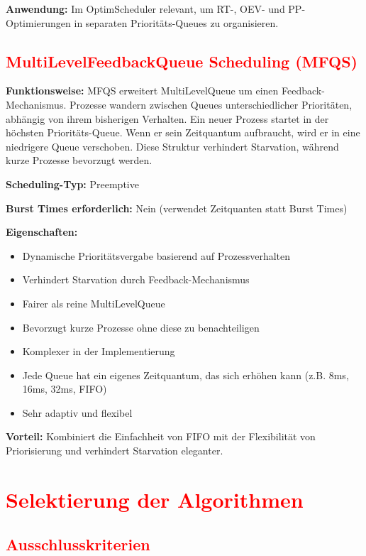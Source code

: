 \textbf{Anwendung:} Im OptimScheduler relevant, um RT-, OEV- und PP-Optimierungen in separaten Prioritäts-Queues zu organisieren.

\subsection{\textcolor{red}{MultiLevelFeedbackQueue Scheduling (MFQS)}}

\textbf{Funktionsweise:} MFQS erweitert MultiLevelQueue um einen Feedback-Mechanismus. Prozesse wandern zwischen Queues unterschiedlicher Prioritäten, abhängig von ihrem bisherigen Verhalten. Ein neuer Prozess startet in der höchsten Prioritäts-Queue. Wenn er sein Zeitquantum aufbraucht, wird er in eine niedrigere Queue verschoben. Diese Struktur verhindert Starvation, während kurze Prozesse bevorzugt werden.

\textbf{Scheduling-Typ:} Preemptive

\textbf{Burst Times erforderlich:} Nein (verwendet Zeitquanten statt Burst Times)

\textbf{Eigenschaften:}
\begin{itemize}
    \item Dynamische Prioritätsvergabe basierend auf Prozessverhalten
    \item Verhindert Starvation durch Feedback-Mechanismus
    \item Fairer als reine MultiLevelQueue
    \item Bevorzugt kurze Prozesse ohne diese zu benachteiligen
    \item Komplexer in der Implementierung
    \item Jede Queue hat ein eigenes Zeitquantum, das sich erhöhen kann (z.B. 8ms, 16ms, 32ms, FIFO)
    \item Sehr adaptiv und flexibel
\end{itemize}

\textbf{Vorteil:} Kombiniert die Einfachheit von FIFO mit der Flexibilität von Priorisierung und verhindert Starvation eleganter.

\section{\textcolor{red}{Selektierung der Algorithmen}}

\subsection{\textcolor{red}{Ausschlusskriterien}}

